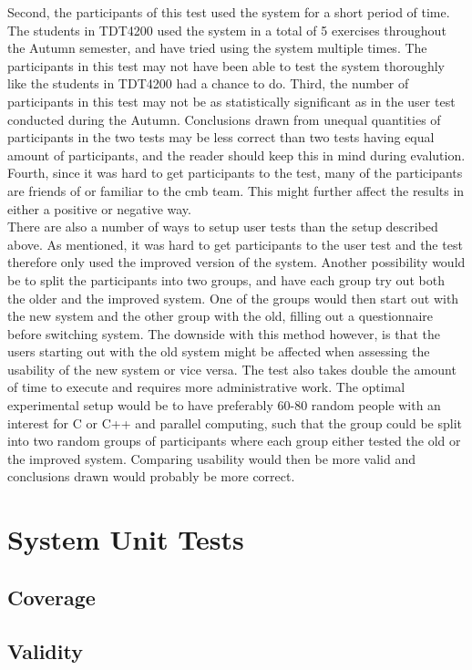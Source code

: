 Second, the participants of this test used the system for a short period of time. The students in TDT4200 used the system in a total of 5 exercises throughout the Autumn semester, and have tried using the system multiple times. The participants in this test may not have been able to test the system thoroughly like the students in TDT4200 had a chance to do. Third, the number of participants in this test may not be as statistically significant as in the user test conducted during the Autumn. Conclusions drawn from unequal quantities of participants in the two tests may be less correct than two tests having equal amount of participants, and the reader should keep this in mind during evalution. Fourth, since it was hard to get participants to the test, many of the participants are friends of or familiar to the \gls{cmb} team. This might further affect the results in either a positive or negative way. \\

There are also a number of ways to setup user tests than the setup described above. As mentioned, it was hard to get participants to the user test and the test therefore only used the improved version of the system. Another possibility would be to split the participants into two groups, and have each group try out both the older and the improved system. One of the groups would then start out with the new system and the other group with the old, filling out a questionnaire before switching system. The downside with this method however, is that the users starting out with the old system might be affected when assessing the usability of the new system or vice versa. The test also takes double the amount of time to execute and requires more administrative work. The optimal experimental setup would be to have preferably 60-80 random people with an interest for C or C++ and parallel computing, such that the group could be split into two random groups of participants where each group either tested the old or the improved system. Comparing usability would then be more valid and conclusions drawn would probably be more correct.


\section{System Unit Tests}

\subsection{Coverage}

\subsection{Validity}
